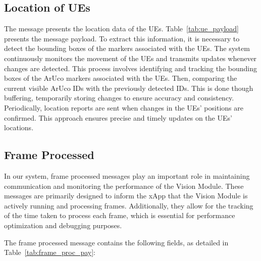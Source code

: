 \subsection{Location of UEs}\label{subsec:location-of-ues}
The message presents the location data of the UEs. Table~\ref{tab:ue_payload} presents the message payload.
To extract this information, it is necessary to detect the bounding boxes of the markers associated with the UEs.
The system continuously monitors the movement of the UEs and transmits updates whenever changes are detected.
This process involves identifying and tracking the bounding boxes of the ArUco markers associated with the UEs.
Then, comparing the current visible ArUco IDs with the previously detected IDs. This is done though buffering, temporarily storing changes to ensure accuracy and consistency.
Periodically, location reports are sent when changes in the UEs' positions are confirmed.
This approach ensures precise and timely updates on the UEs' locations.

\begin{table}[H]
    \caption{Components of the UE Location Message payload}
    \label{tab:ue_payload}
    \centering
\end{table}




\subsection{Frame Processed}\label{subsec:frame-processed}
In our system, frame processed messages play an important role in maintaining communication and monitoring the performance of the Vision Module.
These messages are primarily designed to inform the xApp that the Vision Module is actively running and processing frames.
Additionally, they allow for the tracking of the time taken to process each frame, which is essential for performance optimization and debugging purposes.

The frame processed message contains the following fields, as detailed in Table~\ref{tab:frame_proc_pay}:

